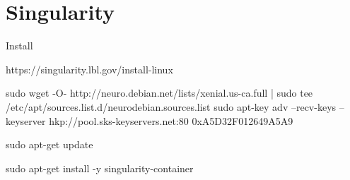 \section*{Singularity}

Install

https://singularity.lbl.gov/install-linux

sudo wget -O- http://neuro.debian.net/lists/xenial.us-ca.full | sudo tee /etc/apt/sources.list.d/neurodebian.sources.list
sudo apt-key adv --recv-keys --keyserver hkp://pool.sks-keyservers.net:80 0xA5D32F012649A5A9

sudo apt-get update

sudo apt-get install -y singularity-container










